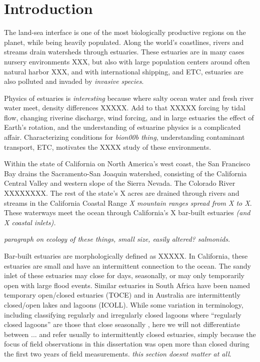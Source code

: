 \chapter{Introduction}
\label{chIntro}

The land-sea interface is one of the most biologically productive regions on the planet, while being heavily populated. Along the world's coastlines, rivers and streams drain watersheds through estuaries.  These estuaries are in many cases nursery environments XXX, but also with large population centers around often natural harbor XXX, and with international shipping, and ETC, estuaries are also polluted and invaded by \emph{invasive species}. 

Physics of estuaries is \emph{interesting} because where salty ocean water and fresh river water meet, density differences XXXXX. Add to that XXXXX forcing by tidal flow, changing riverine discharge, wind forcing, and in large estuaries the effect of Earth's rotation, and the understanding of estuarine physics is a complicated affair. Characterizing conditions for \emph{bion00b thing}, understanding contaminant transport, ETC, motivates the XXXX study of these environments. 

Within the state of California on North America's west coast, the San Francisco Bay drains the Sacramento-San Joaquin watershed, consisting of the California Central Valley and western slope of the Sierra Nevada. The Colorado River XXXXXXXX. The rest of the state's X acres are drained through rivers and streams in the California Coastal Range \emph{X mountain ranges spread from X to X}. These waterways meet the ocean through California's X bar-built estuaries \emph{(and X coastal inlets).}

\emph{paragraph on ecology of these things, small size, easily altered? salmonids.}

Bar-built estuaries are morphologically defined as XXXXX. In California, these estuaries are small and have an intermittent connection to the ocean. The sandy inlet of these estuaries may close for days, seasonally, or may only temporarily open with large flood events. Similar estuaries in South Africa have been named temporary open/closed estuaries (TOCE) and in Australia are intermittently closed/open lakes and lagoons (ICOLL). While some variation in terminology, including classifying regularly and irregularly closed lagoons where ``regularly closed lagoons'' are  those that close seasonally \parencite{davidson_simple_2009}, here we will not differentiate between ... and refer usually to intermittently closed estuaries, simply because the focus of field observations in this dissertation was open more than closed during the first two years of field measurements. \emph{this section doesnt matter at all}. 

